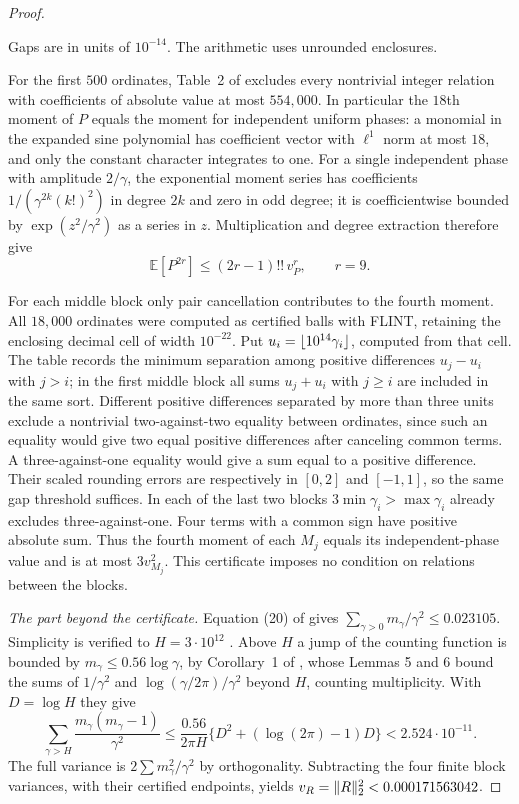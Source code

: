 \begin{proof}
\begin{center}
\smallskip
Gaps are in units of $10^{-14}$. The arithmetic uses unrounded enclosures.
\end{center}
For the first $500$ ordinates, Table~2 of \cite{BestTrudgian2015Linear} excludes every
nontrivial integer relation with coefficients of absolute value at most $554{,}000$. In
particular the $18$th moment of $P$ equals the moment for independent uniform phases:
a monomial in the expanded sine polynomial has coefficient vector with $\ell^1$ norm at
most $18$, and only the constant character integrates to one. For a single independent
phase with amplitude $2/\gamma$, the exponential moment series has coefficients
$1/(\gamma^{2k}(k!)^2)$ in degree $2k$ and zero in odd degree; it is coefficientwise
bounded by $\exp(z^2/\gamma^2)$ as a series in $z$. Multiplication and degree extraction
therefore give
\[
 \mathbb E[P^{2r}]\le(2r-1)!!\,v_P^r,\qquad r=9 .
\]

For each middle block only pair cancellation contributes to the fourth moment. All
$18{,}000$ ordinates were computed as certified balls with FLINT, retaining the enclosing decimal cell
of width $10^{-22}$. Put $u_i=\lfloor10^{14}\gamma_i\rfloor$, computed from that cell. The table
records the minimum separation among positive differences $u_j-u_i$ with $j>i$; in the
first middle block all sums $u_j+u_i$ with $j\ge i$ are included in the same sort.
Different positive differences separated by more than three units exclude a nontrivial
two-against-two equality between ordinates, since such an equality would give two equal
positive differences after canceling common terms. A three-against-one equality would give
a sum equal to a positive difference. Their scaled rounding errors are respectively in
$[0,2]$ and $[-1,1]$, so the same gap threshold suffices. In each of the last two blocks
$3\min\gamma_i>\max\gamma_i$ already excludes three-against-one. Four terms with a common
sign have positive absolute sum. Thus the fourth moment of each $M_j$ equals its
independent-phase value and is at most $3v_{M_j}^2$. This certificate imposes no condition
on relations between the blocks.

\emph{The part beyond the certificate.} Equation (20) of
\cite{BrentPlattTrudgian2022Mean} gives $\sum_{\gamma>0}m_\gamma/\gamma^2\le0.023105$.
Simplicity is verified to $H=3\cdot10^{12}$ \cite{PlattTrudgian2021Riemann}. Above $H$ a
jump of the counting function is bounded by $m_\gamma\le0.56\log\gamma$, by Corollary~1 of
\cite{BrentPlattTrudgian2022Mean}, whose Lemmas 5 and 6 bound the sums of $1/\gamma^2$ and
$\log(\gamma/2\pi)/\gamma^2$ beyond $H$, counting multiplicity. With $D=\log H$ they give
\[
 \sum_{\gamma>H}\frac{m_\gamma(m_\gamma-1)}{\gamma^2}\le
 \frac{0.56}{2\pi H}\bigl\{D^2+(\log(2\pi)-1)D\bigr\}<2.524\cdot10^{-11}.
\]
The full variance is $2\sum m_\gamma^2/\gamma^2$ by orthogonality. Subtracting the four
finite block variances, with their certified endpoints, yields
$v_R=\lVert R\rVert_2^2<0.000171563042$.


\end{proof}
